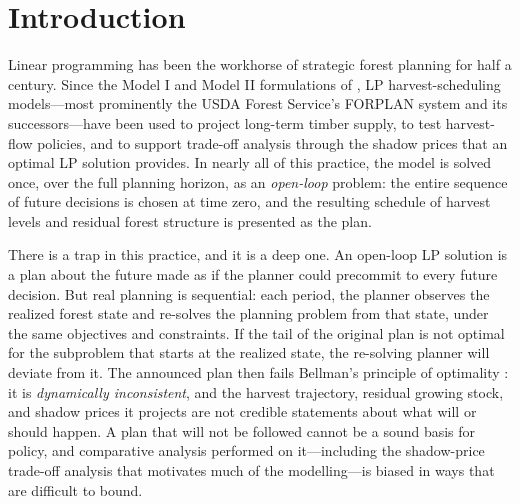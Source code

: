 \section{Introduction}

Linear programming has been the workhorse of strategic forest planning for half a century. Since the Model I and Model II formulations of \citet{johnson1977techniques}, LP harvest-scheduling models---most prominently the USDA Forest Service's FORPLAN system and its successors---have been used to project long-term timber supply, to test harvest-flow policies, and to support trade-off analysis through the shadow prices that an optimal LP solution provides. In nearly all of this practice, the model is solved once, over the full planning horizon, as an \emph{open-loop} problem: the entire sequence of future decisions is chosen at time zero, and the resulting schedule of harvest levels and residual forest structure is presented as the plan.

There is a trap in this practice, and it is a deep one. An open-loop LP solution is a plan about the future made as if the planner could precommit to every future decision. But real planning is sequential: each period, the planner observes the realized forest state and re-solves the planning problem from that state, under the same objectives and constraints. If the tail of the original plan is not optimal for the subproblem that starts at the realized state, the re-solving planner will deviate from it. The announced plan then fails Bellman's principle of optimality \citep{bellman1957dynamic}: it is \emph{dynamically inconsistent}, and the harvest trajectory, residual growing stock, and shadow prices it projects are not credible statements about what will or should happen. A plan that will not be followed cannot be a sound basis for policy, and comparative analysis performed on it---including the shadow-price trade-off analysis that motivates much of the modelling---is biased in ways that are difficult to bound.

